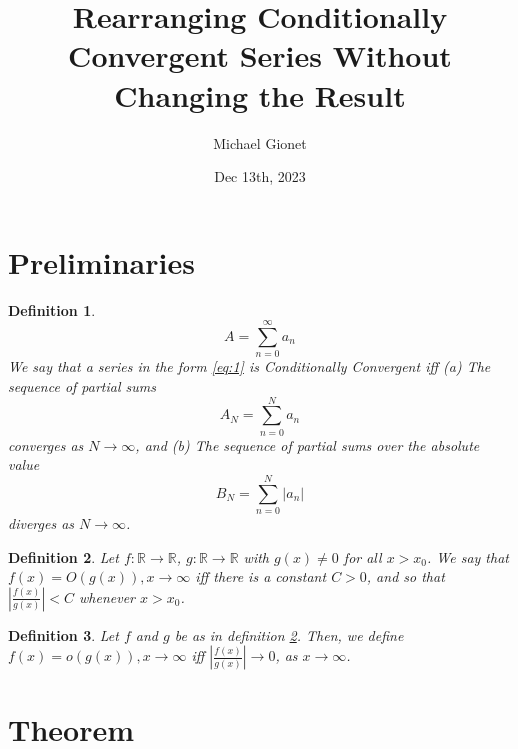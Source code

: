 \documentclass{article}
\title{Rearranging Conditionally Convergent Series Without Changing the Result}
\author{Michael Gionet}
\date{Dec 13th, 2023}
\newtheorem{definition}{Definition}
\begin{document}
	\maketitle
	
	\section{Preliminaries}
	
	
	\begin{definition}
		\begin{equation}
		A = \sum_{n=0}^{\infty} a_n \label{eq:1}
		\end{equation}
		We say that a series in the form \ref{eq:1} is Conditionally Convergent iff \newline
		(a) The sequence of partial sums
		\begin{equation}
		A_N = \sum_{n=0}^{N} a_n
		\end{equation}
		converges as $N \rightarrow \infty$, and \newline
		(b) The sequence of partial sums over the absolute value
		\begin{equation}
		B_N = \sum_{n=0}^{N} |a_n|
		\end{equation}
		diverges as $N \rightarrow \infty$.
		
	\end{definition}
	
	\begin{definition} \label{def}
	Let $f: \mathbb{R} \rightarrow \mathbb{R}$, $g: \mathbb{R} \rightarrow \mathbb{R}$ with $g(x) \ne 0$ for all $x > x_0$. \newline
	We say that $f(x) = O(g(x)), x \rightarrow \infty$ iff there is a constant $C > 0$, and so that $\left| \frac{f(x)}{g(x)} \right| < C $ whenever $x > x_0$.
	\end{definition}

	\begin{definition}
	Let $f$ and $g$ be as in definition \ref{def}. Then, we define $f(x) = o(g(x)), x \rightarrow \infty $ iff $\left| \frac{f(x)}{g(x)} \right| \rightarrow 0$, as $ x \rightarrow \infty$.
	\end{definition}
	
	\section{Theorem}
	
\end{document}
